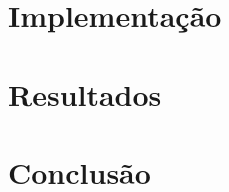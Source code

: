 \documentclass[12pt,a4paper,oneside]{article}
\begin{document}

\section{Implementação}
\label{sec:imp}

\lipsum[0]

\lipsum[1]

\lipsum[2]


\section{Resultados}
\label{sec:res}

\lipsum[0]

\lipsum[1]

\lipsum[2]

\lipsum[3]

\lipsum[4]

\lipsum[5]



\section{Conclusão}
\label{sec:con}

\lipsum[0]

\lipsum[1]

\lipsum[2]




\end{document}
